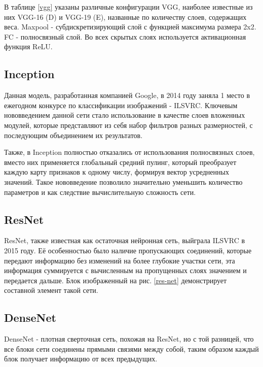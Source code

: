 В таблице \ref{vgg} указаны различные конфигурации VGG, наиболее известные из них VGG-16 (D) и VGG-19 (E), названные по количеству слоев, содержащих веса. Maxpool - субдискретизирующий слой с функцией максимума размера 2x2. FC - полносвязный слой. Во всех скрытых слоях используется активационная функция ReLU. 



\subsection{Inception}
Данная модель\cite{1512.00567}, разработанная компанией Google, в 2014 году заняла 1 место в ежегодном конкурсе по классификации изображений - ILSVRC. Ключевым нововведением данной сети стало использование в качестве слоев вложенных модулей, которые представляют из себя набор фильтров разных размерностей, с последующим объединением их результатов. 



Также, в Inception полностью отказались от использования полносвязных слоев, вместо них применяется глобальный средний пулинг, который преобразует каждую карту признаков к одному числу, формируя вектор усредненных значений. Такое нововведение позволило значительно уменьшить количество параметров и как следствие вычислительную сложность сети.


\subsection{ResNet}
ResNet\cite{ResNet}, также известная как остаточная нейронная сеть, выйграла ILSVRC в 2015 году. Её особенностью было наличие пропускающих соединений, которые передают информацию без изменений на более глубокие участки сети, эта информация суммируется с вычисленным на пропущенных слоях значением и передается дальше. Блок изображенный на рис. \ref{res-net} демонстрирует составной элемент такой сети.



\subsection{DenseNet}
DenseNet\cite{DenseNet} - плотная сверточная сеть, похожая на ResNet, но с той разницей, что все блоки сети соединены прямыми связями между собой, таким образом каждый блок получает информацию от всех предыдущих. 



\clearpage